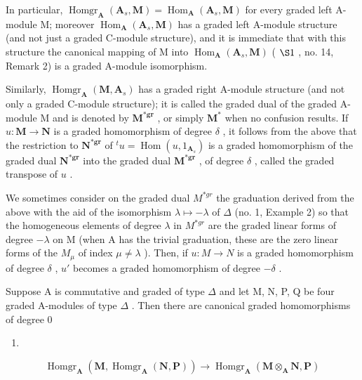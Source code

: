 In particular, \(\operatorname{Homgr}_{\mathbf{A}}(\mathbf{A}_s, \mathbf{M}) = \operatorname{Hom}_{\mathbf{A}}(\mathbf{A}_s, \mathbf{M})\) for every graded left A-module M; moreover \(\operatorname{Hom}_{\mathbf{A}}(\mathbf{A}_s, \mathbf{M})\) has a graded left A-module structure (and not just a graded C-module structure), and it is immediate that with this structure the canonical mapping of M into \(\operatorname{Hom}_{\mathbf{A}}(\mathbf{A}_s, \mathbf{M})\) ( \(\S 1\) , no. 14, Remark 2) is a graded A-module isomorphism.

Similarly, \(\operatorname{Homgr}_{\mathbf{A}}(\mathbf{M}, \mathbf{A}_s)\) has a graded right A-module structure (and not only a graded C-module structure); it is called the graded dual of the graded A-module M and is denoted by \(\mathbf{M}^{*\mathbf{gr}}\) , or simply \(\mathbf{M}^*\) when no confusion results. If \(u: \mathbf{M} \to \mathbf{N}\) is a graded homomorphism of degree \(\delta\) , it follows from the above that the restriction to \(\mathbf{N}^{*\mathbf{gr}}\) of \(^t u = \operatorname{Hom}(u, 1_{\mathbf{A}_s})\) is a graded homomorphism of the graded dual \(\mathbf{N}^{*\mathbf{gr}}\) into the graded dual \(\mathbf{M}^{*\mathbf{gr}}\) , of degree \(\delta\) , called the graded transpose of \(u\) .

We sometimes consider on the graded dual \(M^{*gr}\) the graduation derived from the above with the aid of the isomorphism \(\lambda\mapsto-\lambda\) of \(\Delta\) (no. 1, Example 2) so that the homogeneous elements of degree \(\lambda\) in \(M^{*gr}\) are the graded linear forms of degree \(-\lambda\) on M (when A has the trivial graduation, these are the zero linear forms of the \(M_{\mu}\) of index \(\mu\neq\lambda\) ). Then, if \(u:M\to N\) is a graded homomorphism of degree \(\delta\) , \(u'\) becomes a graded homomorphism of degree \(-\delta\) .

Suppose A is commutative and graded of type \(\Delta\) and let M, N, P, Q be four graded A-modules of type \(\Delta\) . Then there are canonical graded homomorphisms of degree 0

\begin{enumerate}
\def\labelenumi{(\arabic{enumi})}
\setcounter{enumi}{2}
\tightlist
\item
\end{enumerate}

\[
\operatorname{Homgr} _ {\mathbf {A}} (\mathbf {M}, \operatorname{Homgr} _ {\mathbf {A}} (\mathbf {N}, \mathbf {P})) \rightarrow \operatorname{Homgr} _ {\mathbf {A}} (\mathbf {M} \otimes_ {\mathbf {A}} \mathbf {N}, \mathbf {P})\tag{4}
\]


